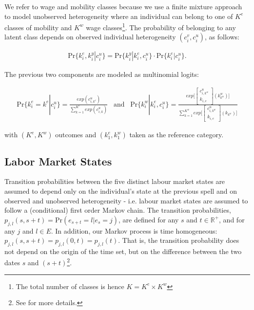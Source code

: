 \documentclass[12pt, a4paper]{article}
\begin{document}
We refer to wage and mobility classes because we use a finite mixture approach to
model unobserved heterogeneity where an individual can belong to one of $K^{e}$ classes of mobility and $K^w$ wage classes\footnote{The total number of classes is hence $K=K^{e}\times K^{w}$}. The probability of belonging to any latent class depends on observed individual heterogeneity $(c_i^v,c_i^u)$, as follows:

\begin{align}\label{eq:prob_unobs_het}
\text{Pr}\{k_i^e,k_i^y|c_i^u\}=\text{Pr}\{k_i^y|k_i^e,c_i^u\}\cdot\text{Pr}\{k_i^e|c_i^u\}.
\end{align}

The previous two components are modeled as multinomial logits:

\begin{align}\label{eq:prob_unobs_het_multin}
\text{Pr}\{k_i^e=k^e|c_i^u\}=\frac{exp(c_{i,k^e}^{u})}{\sum\limits_{k=1}^{K^e}exp(c_{i,k}^{u})} \,\,\,\,\, \text{and} \,\,\,\,\, \text{Pr}\{k_i^w|k_i^e,c_i^u\}=\frac{exp\Big[\begin{bmatrix}
           c_{i,k^w}^{u} \\
           k_{i,e}
         \end{bmatrix}(k_{k^w}^w)\Big]}{\sum\limits_{k=1}^{K^w}exp\Big[\begin{bmatrix}
           c_{i,k^w}^{u} \\
           k_{i,e}
         \end{bmatrix}(k_{k^w})\Big]}
\end{align}

with $(K^e,K^w)$ outcomes and $(k^e_1,k^w_1)$ taken as the reference category.

\subsection{Labor Market States}\label{sec:lab_market_states}

Transition probabilities between the five distinct labour market states are assumed to depend only on the individual's state at the previous spell and on observed and unobserved heterogeneity - i.e. labour market states are assumed to follow a (conditional) first order Markov chain. The transition probabilities, \mbox{$p_{j,l}(s,s+t)=\text{Pr}(e_{s+t}=l|e_{s}=j)$}, are defined for any $s$ and $t \in \mathbb{R}^+$, and for any $j$ and $l \in E$. In addition, our Markov process is time homogeneous: $p_{j,l}(s,s+t)=p_{j,l}(0,t)=p_{j,l}(t)$. That is, the transition probability does not depend on the origin of the time set, but on the difference between the two dates $s$ and $(s+t)$\footnote{See \cite{FlFoMou07} for more details.}. 
\end{document}
